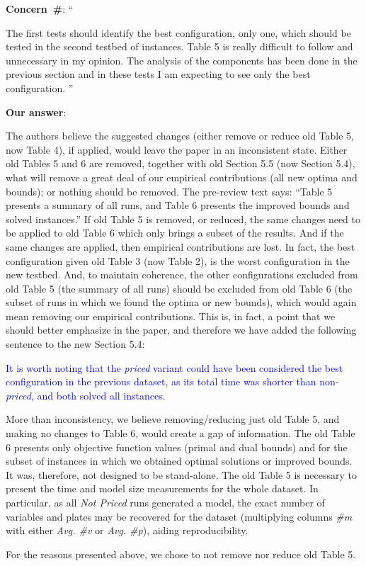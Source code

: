 \documentclass[smallextended]{svjour3}       %
\makeatletter
\newif\iffinalversion
\newcommand{\newtext}[1]{\iffinalversion%
#1%
\else%
\textcolor{blue}{#1}%
\fi%
}
\newcommand\gobblepars{%
    \@ifnextchar\par%
        {\expandafter\gobblepars\@gobble}%
        {}}
\newcounter{concern}
\newenvironment{concern}{%
    \refstepcounter{concern}\par\smallskip\noindent%
    \textbf{Concern~\#\theconcern}: ``\itshape\gobblepars}%
    {\unskip''\smallskip}
\newcounter{answer}
\newenvironment{answer}{%
    \refstepcounter{answer}\par\smallskip\noindent%
    \textbf{Our answer}: \gobblepars}%
    {\unskip\bigskip}
\makeatother
\begin{document}
\begin{concern}
The first tests should identify the best configuration, only one, which should be tested in the second testbed of instances. Table 5 is really difficult to follow and unnecessary in my opinion. The analysis of the components has been done in the previous section and in these tests I am expecting to see only the best configuration.
\end{concern}
\begin{answer}
The authors believe the suggested changes (either remove or reduce old Table 5, now Table 4), if applied, would leave the paper in an inconsistent state. Either old Tables 5 and 6 are removed, together with old Section 5.5 (now Section 5.4), what will remove a great deal of our empirical contributions (all new optima and bounds); or nothing should be removed. The pre-review text says: ``Table 5 presents a summary of all runs, and Table 6 presents the improved bounds and solved instances.'' If old Table 5 is removed, or reduced, the same changes need to be applied to old Table 6 which only brings a subset of the results. And if the same changes are applied, then empirical contributions are lost. In fact, the best configuration given old Table 3 (now Table 2), is the worst configuration in the new testbed. And, to maintain coherence, the other configurations excluded from old Table 5 (the summary of all runs) should be excluded from old Table 6 (the subset of runs in which we found the optima or new bounds), which would again mean removing our empirical contributions. This is, in fact, a point that we should better emphasize in the paper, and therefore we have added the following sentence to the new Section 5.4:

\newtext{It is worth noting that the \emph{priced} variant could have been considered the best configuration in the previous dataset, as its total time was shorter than non-\emph{priced}, and both solved all instances.}

More than inconsistency, we believe removing/reducing just old Table 5, and making no changes to Table 6, would create a gap of information. The old Table 6 presents only objective function values (primal and dual bounds) and for the subset of instances in which we obtained optimal solutions or improved bounds. It was, therefore, not designed to be stand-alone. The old Table 5 is necessary to present the time and model size measurements for the whole dataset. In particular, as all \emph{Not Priced} runs generated a model, the exact number of variables and plates may be recovered for the dataset (multiplying columns \emph{\#m} with either \emph{Avg. \#v} or \emph{Avg. \#p}), aiding reproducibility.

For the reasons presented above, we chose to not remove nor reduce old Table 5.
\end{answer}
\end{document}

